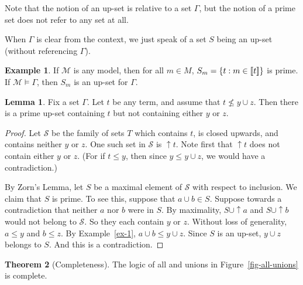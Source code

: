 \documentclass[12pt]{article}
\theoremstyle{definition}
\newtheorem{theorem}{Theorem}
\newtheorem{lemma}[theorem]{Lemma}
\newtheorem{example}{Example}
\newcommand{\semantics}[1]{[\![\mbox{\em $ #1 $\/}]\!]}
\newcommand{\Model}{\mathcal{M}}
\renewcommand{\SS}{\mathcal{S}}
\newcommand{\set}[1]{\{ #1 \}}
\begin{document}
Note that the notion of an up-set is relative to a set $\Gamma$, but the notion of a prime set does not refer to any set at all.

When $\Gamma$ is clear from the context, we just speak of a set $S$ being an up-set (without referencing $\Gamma$).

\begin{example}
If $\Model$ is any model, then for all $m\in M$, $S_m = \set{t : m \in \semantics{t}}$
is   prime.  If $\Model\models\Gamma$, then $S_m$ is an up-set for $\Gamma$.
\label{ex-3}
\end{example}

\begin{lemma}  Fix a set $\Gamma$.
Let $t$ be any term, and assume that $t \not\leq y\cup z$.
Then there is a prime up-set containing $t$ but not containing either $y$ or $z$.
\label{lemma-zorn}
\end{lemma}

\begin{proof}

Let $\SS$ be the family of sets $T$ which contains $t$, is closed upwards, and contains neither  $y$ or $z$.
One such set in $\SS$ is $\uparrow t$.  Note first that $\uparrow t$ does not contain either $y$ or $z$.  (For if $t\leq y$, then since $y\leq y \cup z$, we would have a contradiction.)

By Zorn's Lemma, let $S$ be a maximal element of $\SS$ with respect to inclusion.
We claim that 
$S$ is  prime.   To see this, suppose that $a \cup b\in S$.  Suppose towards a contradiction that neither $a$ nor $b$ were in $S$.
By maximality, $S\cup\uparrow a$ and $S\cup\uparrow b$  would not belong to $\SS$. 
So they each contain $y$ or $z$.   Without loss of generality, $a\leq y$ and $b\leq z$.  
By Example~\ref{ex-1},  $a\cup b \leq y\cup z$.   Since $S$ is an up-set, $y\cup z$ belongs to $S$.    And this is a contradiction.
\end{proof}

\begin{theorem}[Completeness]
The logic of {\sf all} and unions in Figure~\ref{fig-all-unions} is complete.
\label{theorem-first-completeness-union}
\end{theorem}
\end{document}
